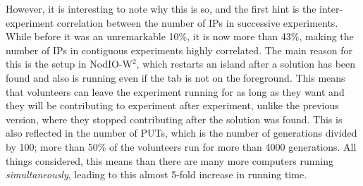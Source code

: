 \documentclass[journal,onecolumn]{IEEEtran}
\begin{document}
However, it is interesting to note why this is so, and the first hint
is the inter-experiment correlation between the number of IPs in
successive experiments. While before it was an unremarkable 10\%, it is
now more than 43\%, making the number of IPs in contiguous experiments
highly correlated. The main reason for this is the setup in {\sf
  NodIO-W$^2$}, which restarts an island after a solution has been
found and also is running even if the tab is not on the
foreground. This means that volunteers can leave the experiment
running for as long as they want and they will be contributing to
experiment after experiment, unlike the previous version, where they
stopped contributing after the solution was found. This is also
reflected in the number of PUTs, which is the number of generations
divided by 100; more than 50\% of the volunteers run for more than
4000 generations. All things considered, this means than there are
many more computers running {\em simultaneously}, leading to this
almost 5-fold increase in running time.
\end{document}
